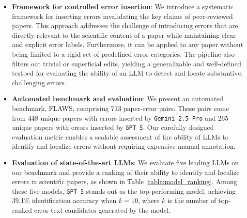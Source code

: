 \documentclass{article}
\newcommand{\gemini}{\texttt{Gemini 2.5 Pro}}
\newcommand{\gpt}{\texttt{GPT 5}}
\newcommand{\benchmark}{FLAWS}
\begin{document}
\begin{itemize}
    \item \textbf{Framework for controlled error insertion}: We introduce a systematic framework for inserting errors invalidating the key claims of peer-reviewed papers. This approach addresses the challenge of introducing errors that are directly relevant to the scientific content of a paper while maintaining clear and explicit error labels. Furthermore, it can be applied to any paper without being limited to a rigid set of predefined error categories. The pipeline also filters out trivial or superficial edits, yielding a generalizable and well-defined testbed for evaluating the ability of an LLM to detect and locate substantive, challenging errors.
    \item \textbf{Automated benchmark and evaluation}: We present an automated benchmark, \benchmark{}, comprising 713 paper-error pairs. These pairs come from 448 unique papers with errors inserted by \gemini{} and 265 unique papers with errors inserted by \gpt{}. Our carefully designed evaluation metric enables a scalable assessment of the ability of LLMs to identify and localize errors without requiring expensive manual annotation.
    \item \textbf{Evaluation of state-of-the-art LLMs}: We evaluate five leading LLMs on our benchmark and provide a ranking of their ability to identify and localize errors in scientific papers, as shown in Table \ref{table:model_ranking}. Among these five models, \gpt{} stands out as the top-performing model, achieving 39.1\% identification accuracy when $k=10$, where $k$ is the number of top-ranked error text candidates generated by the model.



\end{itemize}
\end{document}
